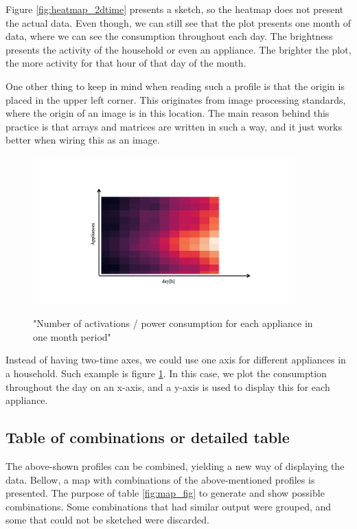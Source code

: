 Figure \ref{fig:heatmap_2dtime} presents a sketch, so the heatmap does not present the actual data. 
Even though, we can still see that the plot presents one month of data, where we can see the consumption throughout each day.
The brightness presents the activity of the household or even an appliance. 
The brighter the plot, the more activity for that hour of that day of the month.

One other thing to keep in mind when reading such a profile is that the origin is placed in the upper left corner.
This originates from image processing standards, where the origin of an image is in this location.
The main reason behind this practice is that arrays and matrices are written in such a way, and it just works better when wiring this as an image.

\begin{figure}[H]
	\centering
	\caption{"Number of activations / power consumption for each appliance in one month period"}
	\includegraphics[width=0.9\textwidth]{Figures/profile_sketches/Slide12.png}
	\label{fig:heatmap_all_appl}
\end{figure}

Instead of having two-time axes, we could use one axis for different appliances in a household. 
Such example is figure \ref{fig:heatmap_all_appl}.
In this case, we plot the consumption throughout the day on an x-axis, and a y-axis is used to display this for each appliance.

\subsection{Table of combinations or detailed table}

The above-shown profiles can be combined, yielding a new way of displaying the data.
Bellow, a map with combinations of the above-mentioned profiles is presented. 
The purpose of table \ref{fig:map_fig} to generate and show possible combinations.
Some combinations that had similar output were grouped, and some that could not be sketched were discarded. 


